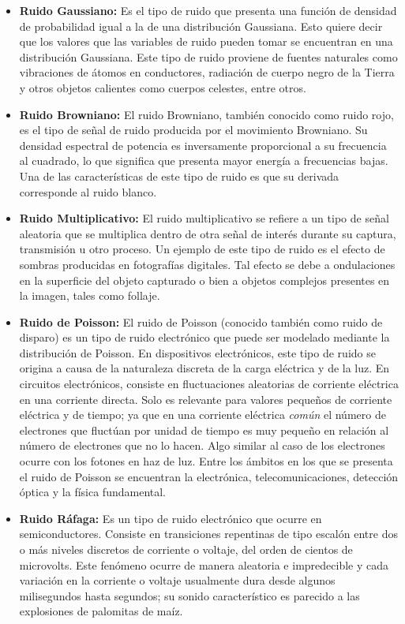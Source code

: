 \begin{itemize}
\item {\bf Ruido Gaussiano:} Es el tipo de ruido que presenta una función de densidad de probabilidad igual a la de una distribución Gaussiana. 
Esto quiere decir que los valores que las variables de ruido pueden tomar se encuentran en una distribución Gaussiana.
Este tipo de ruido proviene de fuentes naturales como vibraciones de átomos en conductores, radiación de cuerpo negro de la Tierra y otros objetos calientes como cuerpos celestes, entre otros.

\item {\bf Ruido Browniano:} El ruido Browniano, también conocido como ruido rojo, es el tipo de señal de ruido producida por el movimiento Browniano.
Su densidad espectral de potencia es inversamente proporcional a su frecuencia al cuadrado, lo que significa que presenta mayor energía a frecuencias bajas.
Una de las características de este tipo de ruido es que su derivada corresponde al ruido blanco.

\item {\bf Ruido Multiplicativo:} El ruido multiplicativo se refiere a un tipo de señal aleatoria que se multiplica dentro de otra señal de interés durante su captura, transmisión u otro proceso.
Un ejemplo de este tipo de ruido es el efecto de sombras producidas en fotografías digitales. 
Tal efecto se debe a ondulaciones en la superficie del objeto capturado o bien a objetos complejos presentes en la imagen, tales como follaje.

\item {\bf Ruido de Poisson:} El ruido de Poisson (conocido también como ruido de disparo) es un tipo de ruido electrónico que puede ser modelado mediante la distribución de Poisson. 
En dispositivos electrónicos, este tipo de ruido se origina a causa de la naturaleza discreta de la carga eléctrica y de la luz.
En circuitos electrónicos, consiste en fluctuaciones aleatorias de corriente eléctrica en una corriente directa.
Solo es relevante para valores pequeños de corriente eléctrica y de tiempo; ya que en una corriente eléctrica {\em común} el número de electrones que fluctúan por unidad de tiempo es muy pequeño en relación al número de electrones que no lo hacen. 
Algo similar al caso de los electrones ocurre con los fotones en haz de luz.
Entre los ámbitos en los que se presenta el ruido de Poisson se encuentran la electrónica, telecomunicaciones, detección óptica y la física fundamental.

\item {\bf Ruido Ráfaga:} Es un tipo de ruido electrónico que ocurre en semiconductores. 
Consiste en transiciones repentinas de tipo escalón entre dos o más niveles discretos de corriente o voltaje, del orden de cientos de microvolts.
Este fenómeno ocurre de manera aleatoria e impredecible y cada variación en la corriente o voltaje usualmente dura desde algunos milisegundos hasta segundos; su sonido característico es parecido a las explosiones de palomitas de maíz. 

\end{itemize}

